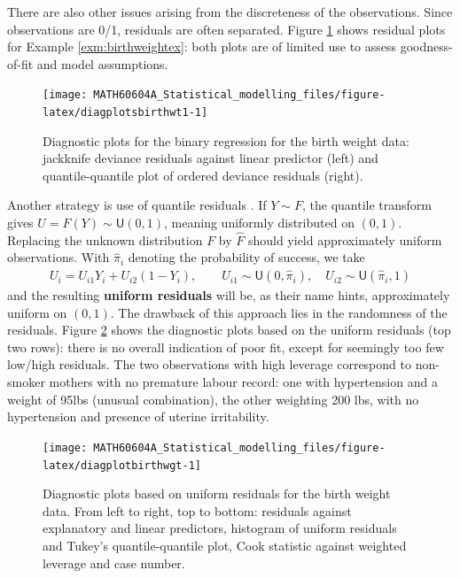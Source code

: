 \documentclass[
  11pt,
  letterpaper,
]{book}
\theoremstyle{definition}
\theoremstyle{definition}
\theoremstyle{definition}
\theoremstyle{definition}
\theoremstyle{remark}
\begin{document}
There are also other issues arising from the discreteness of the
observations. Since observations are 0/1, residuals are often separated.
Figure \ref{fig:diagplotsbirthwt1} shows residual plots for Example
\ref{exm:birthweightex}: both plots are of limited use to assess
goodness-of-fit and model assumptions.

\begin{figure}

{\centering \texttt{[image: MATH60604A\_Statistical\_modelling\_files/figure-latex/diagplotsbirthwt1-1]} 

}

\caption{Diagnostic plots for the binary regression for the birth weight data: jackknife deviance residuals against linear predictor (left) and quantile-quantile plot of ordered deviance residuals (right).}\label{fig:diagplotsbirthwt1}
\end{figure}

Another strategy is use of quantile residuals
\citep{Brillinger/Preisler:1983}. If \(Y \sim F\), the quantile transform gives \(U=F(Y) \sim \mathsf{U}(0,1)\), meaning uniformly distributed on \((0,1)\). Replacing the unknown distribution \(F\) by \(\widehat{F}\) should yield approximately uniform observations. With \(\widehat{\pi}_i\) denoting the probability of success, we take
\begin{align*}
U_i = U_{i1} Y_i + U_{i2}(1-Y_i), \qquad U_{i1} \sim \mathsf{U}(0, \widehat{\pi}_i), \quad U_{i2} \sim \mathsf{U}(\widehat{\pi}_i, 1)
\end{align*}
and the resulting \textbf{uniform residuals} will be, as their name hints, approximately uniform on \((0,1)\). The drawback of this approach lies in the randomness of the residuals. Figure \ref{fig:diagplotbirthwgt} shows the diagnostic plots based on the uniform residuals (top two rows): there is no overall indication of poor fit, except for seemingly too few low/high residuals. The two observations with high leverage correspond to non-smoker mothers with no premature labour record: one with hypertension and a weight of 95lbs (unusual combination), the other weighting 200 lbs, with no hypertension and presence of uterine
irritability.

\begin{figure}

{\centering \texttt{[image: MATH60604A\_Statistical\_modelling\_files/figure-latex/diagplotbirthwgt-1]} 

}

\caption{Diagnostic plots based on uniform residuals for the birth weight data. From left to right, top to bottom: residuals against explanatory and linear predictors, histogram of uniform residuals and Tukey's quantile-quantile plot, Cook statistic against weighted leverage and case number. }\label{fig:diagplotbirthwgt}
\end{figure}
\end{document}
